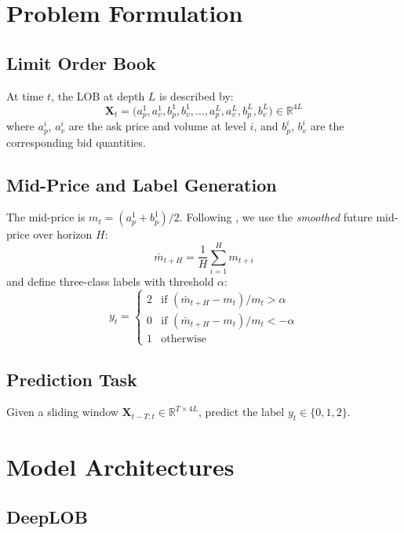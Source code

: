 \documentclass[11pt,a4paper]{article}
\begin{document}
\section{Problem Formulation}
\label{sec:problem}

\subsection{Limit Order Book}

At time $t$, the LOB at depth $L$ is described by:
\[
  \mathbf{X}_t = \bigl(a_p^1, a_v^1, b_p^1, b_v^1, \ldots,
                        a_p^L, a_v^L, b_p^L, b_v^L\bigr) \in \mathbb{R}^{4L}
\]
where $a_p^i$, $a_v^i$ are the ask price and volume at level $i$, and
$b_p^i$, $b_v^i$ are the corresponding bid quantities.

\subsection{Mid-Price and Label Generation}

The mid-price is $m_t = (a_p^1 + b_p^1)/2$.  Following
\citet{zhang2019deeplob}, we use the \emph{smoothed} future mid-price over
horizon $H$:
\[
  \bar{m}_{t+H} = \frac{1}{H}\sum_{i=1}^{H} m_{t+i}
\]
and define three-class labels with threshold $\alpha$:
\[
  y_t = \begin{cases}
    2 & \text{if } (\bar{m}_{t+H} - m_t)/m_t > \alpha \\
    0 & \text{if } (\bar{m}_{t+H} - m_t)/m_t < -\alpha \\
    1 & \text{otherwise}
  \end{cases}
\]

\subsection{Prediction Task}

Given a sliding window $\mathbf{X}_{t-T:t} \in \mathbb{R}^{T \times 4L}$,
predict the label $y_t \in \{0, 1, 2\}$.

\section{Model Architectures}
\label{sec:models}

\subsection{DeepLOB}
\end{document}
